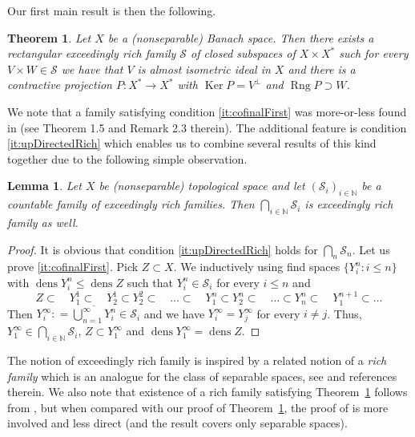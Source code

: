 \documentclass[11pt]{amsart}
\newtheorem{thmx}{Theorem}
\newtheorem{lemma}[thm]{Lemma}
\theoremstyle{definition}
\theoremstyle{remark}
\newcommand{\Nat}{\mathbb N}
\newcommand{\SSS}{\mathcal S}
\def \rng {\operatorname{Rng}}
\def \ker {\operatorname{Ker}}
\def \dens {\operatorname{dens}}
\begin{document}
\noindent Our first main result is then the following.

\begin{thmx}\label{thm:main1}Let $X$ be a (nonseparable) Banach space. Then there exists a rectangular exceedingly rich family $\SSS$ of closed subspaces of $X\times X^*$ such for every $V\times W\in \SSS$ we have that $V$ is almost isometric ideal in $X$ and there is a contractive projection $P:X^*\to X^*$ with $\ker P = V^\perp$ and $\rng P \supset W$.
\end{thmx}

\noindent We note that a family satisfying condition \ref{it:cofinalFirst} was more-or-less found in \cite{Abr15} (see Theorem 1.5 and Remark 2.3 therein). The additional feature is condition \ref{it:upDirectedRich} which enables us to combine several results of this kind together due to the following simple observation.

\begin{lemma}\label{lem:combineRich}Let $X$ be (nonseparable) topological space and let $(\SSS_i)_{i\in\Nat}$ be a countable family of exceedingly rich families. Then $\bigcap_{i\in\Nat} \SSS_i$ is exceedingly rich family as well.
\end{lemma}
\begin{proof}It is obvious that condition \ref{it:upDirectedRich} holds for $\bigcap_{n} \SSS_n$. Let us prove \ref{it:cofinalFirst}. Pick $Z\subset X$. We inductively using find spaces $\{Y_i^n\colon i\leq n\}$ with $\dens Y_i^n\leq \dens Z$ such that $Y_i^n\in\SSS_i$ for every $i\leq n$ and
\[
Z\subset\quad Y_1^1 \subset \quad Y_2^1\subset Y_2^2\subset \quad \ldots \subset \quad Y_1^n\subset Y_2^n\subset \quad \ldots \subset Y_n^n\subset \quad Y_{1}^{n+1}\subset \ldots
\]
Then $Y_i^\infty : =\overline{\bigcup_{n=1}^\infty Y_i^n}\in \SSS_i$ and we have $Y_i^\infty = Y_j^\infty$ for every $i\neq j$. Thus, $Y_1^\infty\in \bigcap_{i\in\Nat} \SSS_i$, $Z\subset Y_1^\infty$ and $\dens Y_1^\infty = \dens Z$.
\end{proof}

\noindent The notion of exceedingly rich family is inspired by a related notion of a \emph{rich family} which is an analogue for the class of separable spaces, see \cite{C18} and references therein. We also note that existence of a rich family satisfying Theorem~\ref{thm:main1} follows from \cite[Theorem 2.4]{Band}, but when compared with our proof of Theorem~\ref{thm:main1}, the proof of \cite[Theorem 2.4]{Band} is more involved and less direct (and the result covers only separable spaces).
\end{document}
